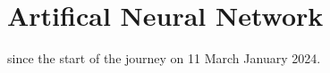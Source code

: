 \chapter{Artifical Neural Network}
\setcounter{section}{0}

 since the start of the journey on 11 March January 2024.
